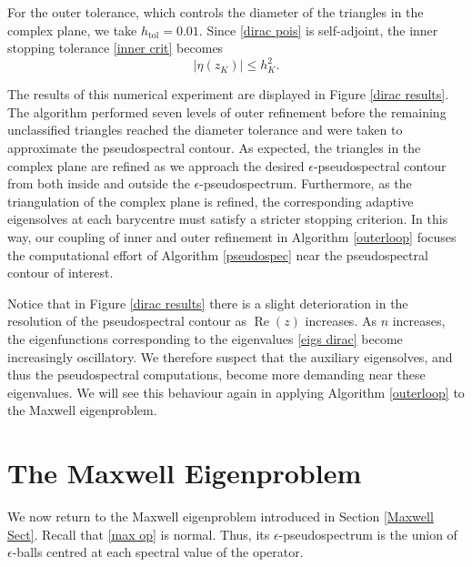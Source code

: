  For the outer tolerance, which controls the diameter of the triangles in the complex plane, we take $h_{\text{tol}} = 0.01.$ Since \eqref{dirac pois} is self-adjoint, the inner stopping tolerance \eqref{inner crit} becomes
  \begin{equation} 
    |\eta(z_K)| \le h_K^2.
  \end{equation}




  The results of this numerical experiment are displayed in Figure \ref{dirac results}. The algorithm performed seven levels of outer refinement before the remaining unclassified triangles reached the diameter tolerance and were taken to approximate the pseudospectral contour.
  As expected, the triangles in the complex plane are refined as we approach the desired $\epsilon$-pseudospectral contour from both inside and outside the $\epsilon$-pseudospectrum. Furthermore, as the triangulation of the complex plane is refined, the corresponding adaptive eigensolves at each barycentre must satisfy a stricter stopping criterion. In this way, our coupling of inner and outer refinement in Algorithm \ref{outerloop} focuses the computational effort of Algorithm \ref{pseudospec} near the pseudospectral contour of interest. 


 Notice that in Figure \ref{dirac results} there is a slight deterioration in the resolution of the pseudospectral contour as $\operatorname{Re}(z)$ increases. As  $n$ increases, the eigenfunctions corresponding to the eigenvalues \eqref{eigs dirac} become increasingly oscillatory. We therefore suspect that the auxiliary eigensolves, and thus the pseudospectral computations, become more demanding near these eigenvalues. We will see this behaviour again in applying Algorithm \ref{outerloop} to the Maxwell eigenproblem.


  



\section{The Maxwell Eigenproblem} \label{maxwell results}

We now return to the Maxwell eigenproblem introduced in Section \ref{Maxwell Sect}.  Recall that \eqref{max op} is normal. Thus, its $\epsilon$-pseudospectrum is the union of $\epsilon$-balls centred at each spectral value of the operator. 

